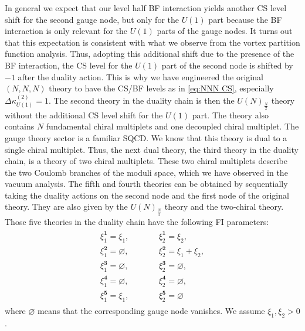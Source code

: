 \documentclass[a4paper,11pt]{article}
\begin{document}
In general we expect that our level half BF interaction yields another CS level shift for the second gauge node, but only for the $U(1)$ part because the BF interaction is only relevant for the $U(1)$ parts of the gauge nodes. It turns out that this expectation is consistent with what we observe from the vortex partition function analysis. Thus, adopting this additional shift due to the presence of the BF interaction, the CS level for the $U(1)$ part of the second node is shifted by $-1$ after the duality action. This is why we have engineered the original $(N,N,N)$ theory to have the CS/BF levels as in \eqref{eq:NNN CS}, especially $\Delta \kappa_{U(1)}^{(2)} = 1$. The second theory in the duality chain is then the $U(N)_{\frac{N}{2}}$ theory without the additional CS level shift for the $U(1)$ part. The theory also contains $N$ fundamental chiral multiplets and one decoupled chiral multiplet. The gauge theory sector is a familiar SQCD. We know that this theory is dual to a single chiral multiplet. Thus, the next dual theory, the third theory in the duality chain, is a theory of two chiral multiplets. These two chiral multiplets describe the two Coulomb branches of the moduli space, which we have observed in the vacuum analysis. The fifth and fourth theories can be obtained by sequentially taking the duality actions on the second node and the first node of the original theory. They are also given by the $U(N)_{\frac{N}{2}}$ theory and the two-chiral theory. Those five theories in the duality chain have the following FI parameters:
\begin{align}
\label{eq:NNN FI}
\begin{array}{lll}
\xi^{\mathbf 1}_1 = \xi_1, &\qquad& \xi^{\mathbf 1}_2 = \xi_2, \\
\xi^{\mathbf 2}_1 = \varnothing, &\qquad& \xi^{\mathbf 2}_2 = \xi_1+\xi_2, \\
\xi^{\mathbf 3}_1 = \varnothing, &\qquad& \xi^{\mathbf 3}_2 = \varnothing, \\
\xi^{\mathbf 4}_1 = \varnothing, &\qquad& \xi^{\mathbf 4}_2 = \varnothing, \\
\xi^{\mathbf 5}_1 = \xi_1, &\qquad& \xi^{\mathbf 5}_2 = \varnothing
\end{array}
\end{align}
where $\varnothing$ means that the corresponding gauge node vanishes. We assume $\xi_1,\xi_2 > 0$.
\end{document}
